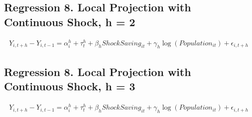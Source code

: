 \documentclass[a4paper, 10pt]{article}
\begin{document}
\begin{table}[H]
\centering
\caption{Regression 8. Local Projection with Continuous Shock, h = 1: 의사}

\end{table}

\subsection{Regression 8. Local Projection with Continuous Shock, h = 2}
\begin{align*}
    Y_{i,t+h}-Y_{i,t-1}=\alpha_i^h+\tau_t^h+\beta_h ShockSaving_{it}+\gamma_h\log(Population_{it})+\epsilon_{i,t+h}
\end{align*}
\begin{table}[H]
\centering
\caption{Regression 8. Local Projection with Continuous Shock, h = 2: 의원}

\end{table}

\begin{table}[H]
\centering
\caption{Regression 8. Local Projection with Continuous Shock, h = 2: 병원}

\end{table}

\begin{table}[H]
\centering
\caption{Regression 8. Local Projection with Continuous Shock, h = 2: 종합병원}

\end{table}

\begin{table}[H]
\centering
\caption{Regression 8. Local Projection with Continuous Shock, h = 2: 상급종합병원}

\end{table}

\begin{table}[H]
\centering
\caption{Regression 8. Local Projection with Continuous Shock, h = 2: 의사}

\end{table}

\subsection{Regression 8. Local Projection with Continuous Shock, h = 3}
\begin{align*}
    Y_{i,t+h}-Y_{i,t-1}=\alpha_i^h+\tau_t^h+\beta_h ShockSaving_{it}+\gamma_h\log(Population_{it})+\epsilon_{i,t+h}
\end{align*}
\begin{table}[H]
\centering
\caption{Regression 8. Local Projection with Continuous Shock, h = 3: 의원}

\end{table}
\end{document}

